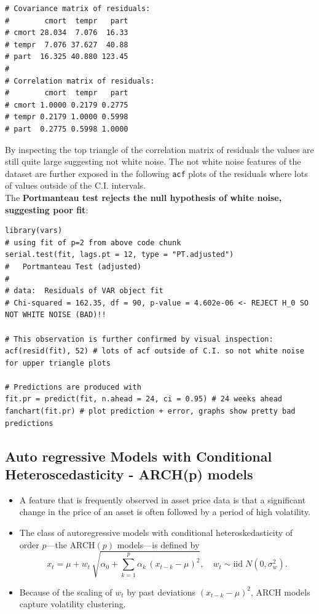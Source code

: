\documentclass[11pt]{article}
\newcommand{\noi}{\noindent}
\begin{document}
\begin{lstlisting}
# Covariance matrix of residuals:
#        cmort  tempr   part
# cmort 28.034  7.076  16.33
# tempr  7.076 37.627  40.88
# part  16.325 40.880 123.45
# 
# Correlation matrix of residuals:
#        cmort  tempr   part
# cmort 1.0000 0.2179 0.2775
# tempr 0.2179 1.0000 0.5998
# part  0.2775 0.5998 1.0000
\end{lstlisting}
\noi By inspecting the top triangle of the correlation matrix of residuals the values are still quite large suggesting not white noise. The not white noise features of the dataset are further exposed in the following \texttt{acf} plots of the residuals where lots of values outside of the C.I. intervals. \\

\noi The \textbf{Portmanteau test rejects the null hypothesis of white noise, suggesting poor fit}:
\begin{lstlisting}
library(vars)
# using fit of p=2 from above code chunk
serial.test(fit, lags.pt = 12, type = "PT.adjusted")
# 	Portmanteau Test (adjusted)
# 
# data:  Residuals of VAR object fit
# Chi-squared = 162.35, df = 90, p-value = 4.602e-06 <- REJECT H_0 SO NOT WHITE NOISE (BAD)!!

# This observation is further confirmed by visual inspection:
acf(resid(fit), 52) # lots of acf outside of C.I. so not white noise for upper triangle plots

# Predictions are produced with
fit.pr = predict(fit, n.ahead = 24, ci = 0.95) # 24 weeks ahead
fanchart(fit.pr) # plot prediction + error, graphs show pretty bad predictions
\end{lstlisting}

\subsection{Auto regressive Models with Conditional Heteroscedasticity - ARCH(p) models}
\begin{itemize}
  \item A feature that is frequently observed in asset price data is that a significant change in the price of an asset is often followed by a period of high volatility.
  \item The class of autoregressive models with conditional heteroskedasticity of order \(p\)—the ARCH\((p)\) models—is defined by
    \[
      x_t = \mu + w_t \,\sqrt{\alpha_0 + \sum_{k=1}^p \alpha_k\,(x_{t-k}-\mu)^2},
      \quad w_t\sim\mathrm{iid}\;N(0,\sigma_w^2).
    \]
  \item Because of the scaling of \(w_t\) by past deviations \((x_{t-k}-\mu)^2\), ARCH models capture volatility clustering.
\end{itemize} \phantom{i}
\end{document}
